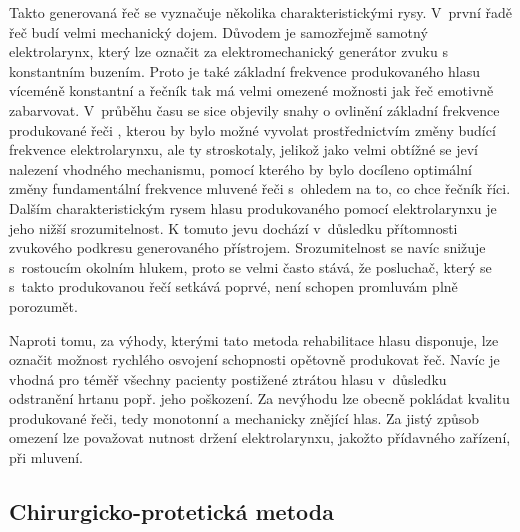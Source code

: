 
Takto generovaná řeč se vyznačuje několika charakteristickými rysy. V~první
řadě řeč budí velmi mechanický dojem. Důvodem je samozřejmě samotný
elektrolarynx, který lze označit za elektromechanický generátor zvuku s
konstantním buzením. Proto je také základní frekvence produkovaného hlasu víceméně konstantní a řečník tak má velmi omezené možnosti jak řeč emotivně zabarvovat. V~průběhu času se sice objevily snahy o ovlinění základní frekvence produkované řeči \cite{Kikuchi2004, Uemi1994, Goldstein2004}, kterou by bylo možné vyvolat prostřednictvím změny budící frekvence elektrolarynxu, ale ty stroskotaly, jelikož jako velmi obtížné se jeví nalezení vhodného mechanismu, pomocí kterého by bylo docíleno optimální změny fundamentální frekvence mluvené řeči s~ohledem na to, co chce řečník říci. Dalším charakteristickým rysem hlasu produkovaného pomocí elektrolarynxu je jeho nižší srozumitelnost. K tomuto jevu dochází v~důsledku přítomnosti zvukového podkresu generovaného přístrojem. Srozumitelnost se navíc snižuje s~rostoucím okolním hlukem, proto se velmi často stává, že posluchač, který se s~takto produkovanou řečí setkává poprvé, není schopen promluvám plně porozumět.

Naproti tomu, za výhody, kterými tato metoda rehabilitace hlasu disponuje, lze označit možnost rychlého
osvojení schopnosti opětovně produkovat řeč. Navíc je vhodná pro téměř všechny pacienty
postižené ztrátou hlasu v~důsledku odstranění hrtanu popř. jeho poškození.
Za nevýhodu lze obecně pokládat kvalitu produkované řeči, tedy monotonní a
mechanicky znějící hlas. Za jistý způsob omezení lze považovat nutnost držení elektrolarynxu, jakožto přídavného zařízení, při mluvení.




\subsection{Chirurgicko-protetická metoda} %
\label{chap:cause:treatment:tracheo}

